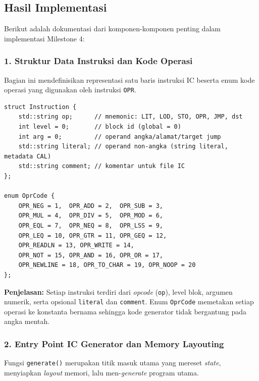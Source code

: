 \documentclass[12pt, a4paper]{article}
\begin{document}
\subsection{Hasil Implementasi}

Berikut adalah dokumentasi dari komponen-komponen penting dalam implementasi Milestone 4:

\subsubsection*{1. Struktur Data Instruksi dan Kode Operasi}
Bagian ini mendefinisikan representasi satu baris instruksi IC beserta enum kode operasi yang digunakan oleh instruksi \texttt{OPR}.

\begin{lstlisting}[caption={Struktur data Instruction dan enum OprCode}]
struct Instruction {
    std::string op;      // mnemonic: LIT, LOD, STO, OPR, JMP, dst
    int level = 0;       // block id (global = 0)
    int arg = 0;         // operand angka/alamat/target jump
    std::string literal; // operand non-angka (string literal, metadata CAL)
    std::string comment; // komentar untuk file IC
};

enum OprCode {
    OPR_NEG = 1,  OPR_ADD = 2,  OPR_SUB = 3,
    OPR_MUL = 4,  OPR_DIV = 5,  OPR_MOD = 6,
    OPR_EQL = 7,  OPR_NEQ = 8,  OPR_LSS = 9,
    OPR_LEQ = 10, OPR_GTR = 11, OPR_GEQ = 12,
    OPR_READLN = 13, OPR_WRITE = 14,
    OPR_NOT = 15, OPR_AND = 16, OPR_OR = 17,
    OPR_NEWLINE = 18, OPR_TO_CHAR = 19, OPR_NOOP = 20
};
\end{lstlisting}

\textbf{Penjelasan:} Setiap instruksi terdiri dari \textit{opcode} (\texttt{op}), level blok, argumen numerik, serta opsional \texttt{literal} dan \texttt{comment}. Enum \texttt{OprCode} memetakan setiap operasi ke konstanta bernama sehingga kode generator tidak bergantung pada angka mentah.

\vspace{0.5cm}

\subsubsection*{2. Entry Point IC Generator dan Memory Layouting}
Fungsi \texttt{generate()} merupakan titik masuk utama yang mereset \textit{state}, menyiapkan \textit{layout} memori, lalu men-\textit{generate} program utama.
\end{document}
